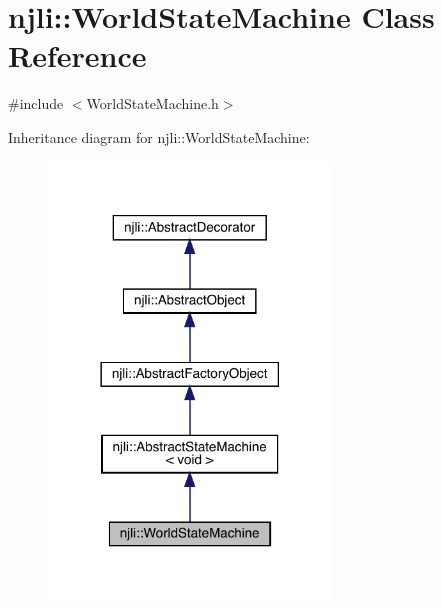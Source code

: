 \hypertarget{classnjli_1_1_world_state_machine}{}\section{njli\+:\+:World\+State\+Machine Class Reference}
\label{classnjli_1_1_world_state_machine}


{\ttfamily \#include $<$World\+State\+Machine.\+h$>$}



Inheritance diagram for njli\+:\+:World\+State\+Machine\+:\nopagebreak
\begin{figure}[H]
\begin{center}
\leavevmode
\includegraphics[width=213pt]{classnjli_1_1_world_state_machine__inherit__graph}
\end{center}
\end{figure}


